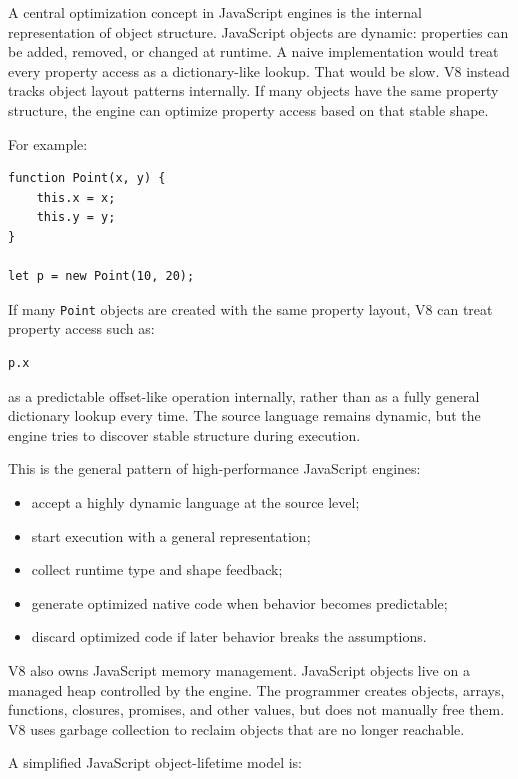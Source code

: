 A central optimization concept in JavaScript engines is the internal representation of object structure. JavaScript objects are dynamic: properties can be added, removed, or changed at runtime. A naive implementation would treat every property access as a dictionary-like lookup. That would be slow. V8 instead tracks object layout patterns internally. If many objects have the same property structure, the engine can optimize property access based on that stable shape.

For example:

\begin{verbatim}
function Point(x, y) {
    this.x = x;
    this.y = y;
}

let p = new Point(10, 20);
\end{verbatim}

If many \texttt{Point} objects are created with the same property layout, V8 can treat property access such as:

\begin{verbatim}
p.x
\end{verbatim}

as a predictable offset-like operation internally, rather than as a fully general dictionary lookup every time. The source language remains dynamic, but the engine tries to discover stable structure during execution.

This is the general pattern of high-performance JavaScript engines:

\begin{itemize}
    \item accept a highly dynamic language at the source level;
    \item start execution with a general representation;
    \item collect runtime type and shape feedback;
    \item generate optimized native code when behavior becomes predictable;
    \item discard optimized code if later behavior breaks the assumptions.
\end{itemize}

V8 also owns JavaScript memory management. JavaScript objects live on a managed heap controlled by the engine. The programmer creates objects, arrays, functions, closures, promises, and other values, but does not manually free them. V8 uses garbage collection to reclaim objects that are no longer reachable.

A simplified JavaScript object-lifetime model is:

